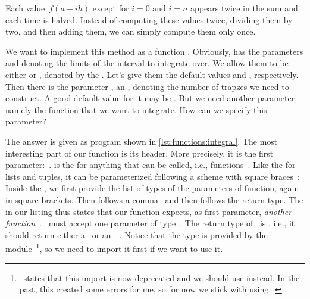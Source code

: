 Each value~$f(a+ih)$ except for $i=0$ and $i=n$ appears twice in the sum and each time is halved.
Instead of computing these values twice, dividing them by two, and then adding them, we can simply compute them only once.

We want to implement this method as a function .
Obviously,  has the parameters  and  denoting the limits of the interval to integrate over.
We allow them to be either  or , denoted by the  .
Let's give them the default values  and , respectively.
Then there is the parameter , an , denoting the number of trapzes we need to construct.
A good default value for it may be .
But we need another parameter, namely the function  that we want to integrate.
How can we specify this parameter?

The answer is given as program  shown in \cref{lst:functions:integral}.
The most interesting part of our  function is its header.
More precisely, it is the first parameter:~.
 is the  for anything that can be called, i.e., functions~\cite{PSF:P3D:TPSL:ACO}.
Like the  for lists and tuples, it can be parameterized following a scheme with square braces~\cite{PEP612}:%
%
%
%
Inside the , we first provide the list of types of the parameters of function, again in square brackets.
Then follows a comma~\pythonil{,} and then follows the return type.
The  in our listing thus states that our function  expects, as first parameter, \emph{another function}~.
~must accept one parameter of type~.
The return type of~ is , i.e., it should return either a~ or an~~\cite{PEP604}.
Notice that the type  is provided by the module~\footnote{%
\cite{PSF:P3D:TPSL:ACO}~states that this import is now deprecated and we should use  instead. %
In the past, this created some errors for me, so for now we stick with using~.}, %
so we need to import it first if we want to use it.

